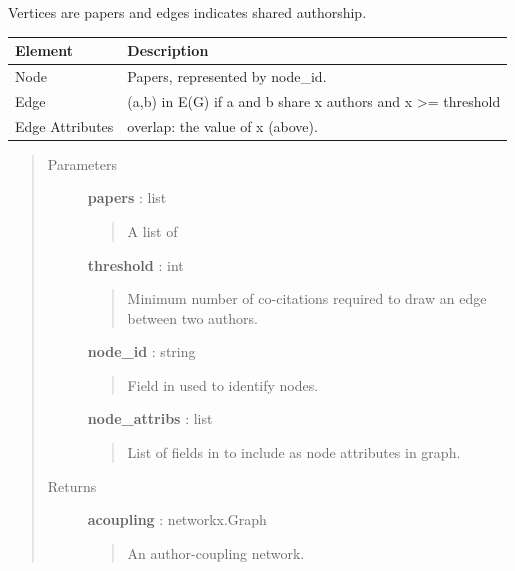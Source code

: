 \documentclass[letterpaper,10pt,english]{sphinxmanual}
\begin{document}
\begin{fulllineitems}
\label{tethne.networks.papers:tethne.networks.papers.author_coupling}
Vertices are papers and edges indicates shared authorship.

\begin{tabulary}{\linewidth}{|L|L|}
\hline
\textsf{\relax 
Element
} & \textsf{\relax 
Description
}\\
\hline
Node
 & 
Papers, represented by node\_id.
\\

Edge
 & 
(a,b) in E(G) if a and b share x authors and x \textgreater{}=
threshold
\\

Edge Attributes
 & 
overlap: the value of x (above).
\\
\hline\end{tabulary}

\begin{quote}\begin{description}
\item[{Parameters}] \leavevmode
\textbf{papers} : list
\begin{quote}

A list of {\hyperref[tethne.classes.paper:tethne.classes.paper.Paper]{}}
\end{quote}

\textbf{threshold} : int
\begin{quote}

Minimum number of co-citations required to draw an edge between two
authors.
\end{quote}

\textbf{node\_id} : string
\begin{quote}

Field in {\hyperref[tethne.classes.paper:tethne.classes.paper.Paper]{}} used to identify nodes.
\end{quote}

\textbf{node\_attribs} : list
\begin{quote}

List of fields in {\hyperref[tethne.classes.paper:tethne.classes.paper.Paper]{}} to include as node attributes in
graph.
\end{quote}

\item[{Returns}] \leavevmode
\textbf{acoupling} : networkx.Graph
\begin{quote}

An author-coupling network.
\end{quote}

\end{description}\end{quote}

\end{fulllineitems}
\end{document}
